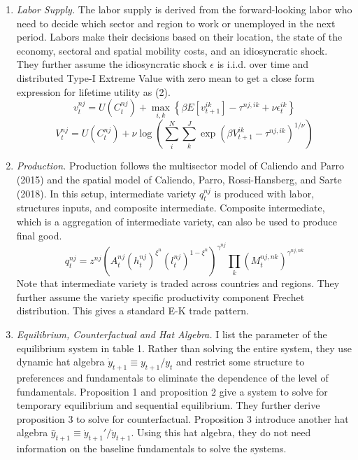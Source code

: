 \documentclass{article}
\begin{document}
\begin{enumerate}
    \item \textit{Labor Supply. } The labor supply is derived from the forward-looking labor who need to decide which sector and region to work or unemployed in the next period. Labors make their decisions based on their location, the state of the economy, sectoral and spatial mobility costs, and an idiosyncratic shock. They further assume the idiosyncratic shock $\epsilon$ is i.i.d. over time and distributed Type-I Extreme Value with zero mean to get a close form expression for lifetime utility as (2).
    \begin{equation}
        v^{nj}_t = U(C_t^{nj})+\max_{i,k}\left\{\beta E[v_{t+1}^{ik}]-\tau^{nj,ik}+\nu \epsilon_t^{ik}\right\}
    \end{equation}
    \begin{equation}
        V^{nj}_t = U(C_t^{nj})+\nu\log\left( \sum_i^N \sum_k^J \exp(\beta V_{t+1}^{ik}-\tau^{nj,ik})^{1/\nu} \right)
    \end{equation}
    \item \textit{Production. } Production follows the multisector model of Caliendo and Parro (2015) and the spatial model of Caliendo, Parro, Rossi-Hansberg, and Sarte (2018). In this setup, intermediate variety $q_t^{nj}$ is produced with labor, structures inputs, and composite intermediate. Composite intermediate, which is a aggregation of intermediate variety, can also be used to produce final good. 
    \begin{equation}
        q_t^{nj} = z^{nj} (A_t^{nj}(h_t^{nj})^{\xi^n}(l_t^{nj})^{1-\xi^n})^{\gamma^{nj}}\prod_k(M_t^{nj,nk})^{\gamma^{nj,nk}}
    \end{equation}
    Note that intermediate variety is traded across countries and regions. They further assume the variety specific productivity component Frechet distribution. This gives a standard E-K trade pattern. 
    \item \textit{Equilibrium, Counterfactual and Hat Algebra. } I list the parameter of the equilibrium system in table 1. Rather than solving the entire system, they use dynamic hat algebra $\dot{y}_{t+1} \equiv y_{t+1}/y_{t}$ and restrict some structure to preferences and fundamentals to eliminate the dependence of the level of fundamentals. Proposition 1 and proposition 2 give a system to solve for temporary equilibrium and sequential equilibrium. They further derive proposition 3 to solve for counterfactual. Proposition 3 introduce another hat algebra $\hat{y}_{t+1} \equiv \dot{y}_{t+1}' / \dot{y}_{t+1}$. Using this hat algebra, they do not need information on the baseline fundamentals to solve the systems. 

\end{enumerate}
\end{document}
